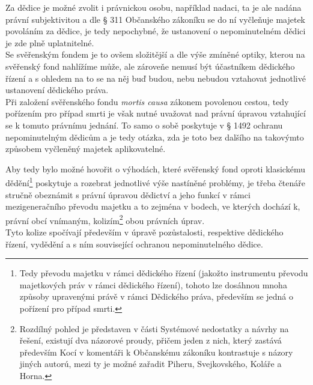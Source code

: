 \documentclass{article}
\begin{document}
Za dědice je možné zvolit i právnickou osobu, například nadaci, ta je ale nadána právní subjektivitou a dle § 311 Občanského zákoníku se do ní vyčleňuje majetek povoláním za dědice, je tedy nepochybné, že ustanovení o nepominutelném dědici je zde plně uplatnitelné.\\

Se svěřenským fondem je to ovšem složitější a dle výše zmíněné optiky, kterou na svěřenský fond nahlížíme může, ale zároveňe nemusí být účastníkem dědického řízení a s ohledem na to se na něj buď budou, nebu nebudou vztahovat jednotlivé ustanovení dědického práva.\\

Při založení svěřenského fondu \textit{mortis causa} zákonem povolenou cestou, tedy pořízením pro případ smrti je však nutné uvažovat nad právní úpravou vztahující se k tomuto právnímu jednání. To samo o sobě poskytuje v § 1492 ochranu nepominutelným dědicům a je tedy otázka, zda je toto bez dalšího na takovýmto způsobem vyčleněný majetek aplikovatelné.\\


\newpage

Aby tedy bylo možné hovořit o výhodách, které svěřenský fond oproti klasickému dědění\footnote{Tedy převodu majetku v rámci dědického řízení (jakožto instrumentu převodu majetkových práv v rámci dědického řízení), tohoto lze dosáhnou mnoha způsoby upravenými právě v rámci Dědického práva, především se jedná o pořízení pro případ smrti.} poskytuje a rozebrat jednotlivé výše nastíněné problémy, je třeba čtenáře stručně obeznámit s právní úpravou dědictví a jeho funkcí v rámci mezigeneračního převodu majetku a to zejména v bodech, ve kterých dochází k, právní obcí vnímaným, kolizím\footnote{Rozdílný pohled je představen v části Systémové nedostatky a návrhy na řešení, existují dva názorové proudy, přičem jeden z nich, který zastává především Kocí v komentáři k Občanskému zákoníku kontrastuje s názory jiných autorú, mezi ty je možné zařadit Piheru, Svejkovského, Koláře a Horna.} obou právních úprav.\\


Tyto kolize spočívají především v úpravě pozůstalosti, respektive dědického řízení, vydědění a s ním související ochranou nepominutelného dědice.\\
\end{document}
